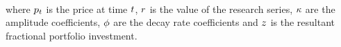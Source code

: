 ﻿﻿\documentclass{article}
\begin{document}
\hspace{200mm}

\noindent where $p_t$ is the price at time $t$, $r$ is the value of the research series, $\kappa$ are the amplitude coefficients, $\phi$ are the decay rate coefficients and $z$ is the resultant fractional portfolio investment.

\hspace{200mm}
\hspace{200mm}

\keyterms
\furtherlinks
\end{document}
